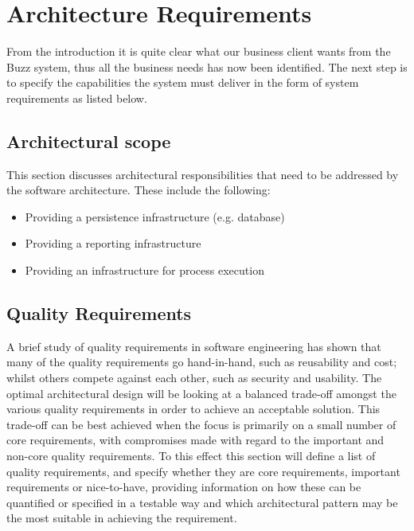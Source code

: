 \documentclass[a4paper]{article}
\begin{document}
\section{Architecture Requirements}

From the introduction it is quite clear what our business client wants from the Buzz system, thus all the business needs has now been identified. The next step is to specify the capabilities the system must deliver in the form of system requirements as listed  below. 

\subsection{Architectural scope}
This section discusses architectural responsibilities that need to be addressed by the software
architecture. These include the following:

\begin{itemize}
\item Providing a persistence infrastructure (e.g. database)
\item Providing a reporting infrastructure
\item Providing an infrastructure for process execution
\end{itemize}

\subsection{Quality Requirements}
A brief study of quality requirements in software engineering has shown that many of the quality requirements go hand-in-hand, such as reusability and cost; whilst others compete against each other, such as security and usability. The optimal architectural design will be looking at a balanced trade-off amongst the various quality requirements in order to achieve an acceptable solution.  This trade-off can be best achieved when the focus is primarily on a small number of core requirements, with compromises made with regard to the important and non-core quality requirements. To this effect this section will define a list of quality requirements, and specify whether they are core requirements, important requirements or nice-to-have, providing information on how these can be quantified or specified in a testable way and which architectural pattern may be the most suitable in achieving the requirement.
\end{document}
